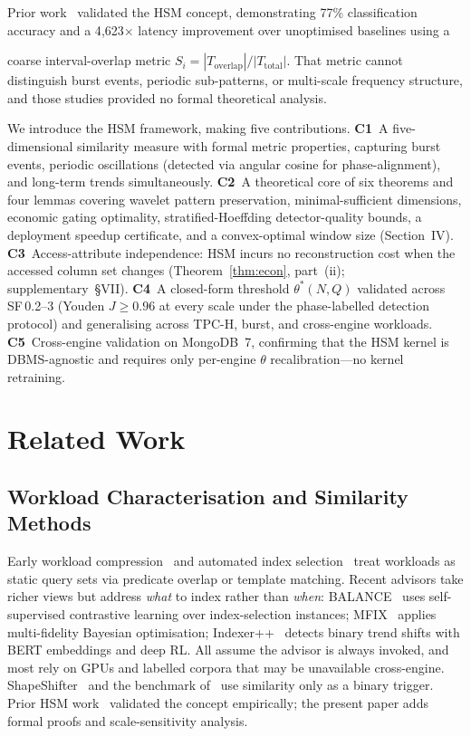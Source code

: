 \documentclass[10pt,journal,compsoc]{IEEEtran}
\newcommand{\thetastar}{\theta^{*}}
\begin{document}
Prior work~\cite{Reungsinkonkarn2026iEEECON,Reungsilpkolkarn2026ICICT}
validated the HSM concept, demonstrating 77\% classification accuracy and
a 4{,}623$\times$ latency improvement over unoptimised baselines using a

coarse interval-overlap metric $S_i=|T_{\mathrm{overlap}}|/|T_{\mathrm{total}}|$.
That metric cannot distinguish burst events, periodic sub-patterns, or
multi-scale frequency structure, and those studies provided no formal
theoretical analysis.

We introduce the HSM framework, making five contributions.
\textbf{C1}~A five-dimensional similarity measure with formal metric
properties, capturing burst events, periodic oscillations (detected
via angular cosine for phase-alignment), and long-term trends
simultaneously.
\textbf{C2}~A theoretical core of six theorems and four lemmas
covering wavelet pattern preservation, minimal-sufficient dimensions,
economic gating optimality, stratified-Hoeffding detector-quality
bounds, a deployment speedup certificate, and a convex-optimal
window size (Section~IV).
\textbf{C3}~Access-attribute independence: HSM incurs no
reconstruction cost when the accessed column set changes
(Theorem~\ref{thm:econ}, part~(ii); supplementary~\S VII).
\textbf{C4}~A closed-form threshold $\thetastar(N,Q)$ validated
across SF\,0.2--3 (Youden $J\!\ge\!0.96$ at every scale under the
phase-labelled detection protocol) and generalising across TPC-H,
burst, and cross-engine workloads.
\textbf{C5}~Cross-engine validation on MongoDB~7, confirming that
the HSM kernel is DBMS-agnostic and requires only per-engine
$\theta$ recalibration---no kernel retraining.

\section{Related Work}

\subsection{Workload Characterisation and Similarity Methods}

Early workload compression~\cite{Schnaitter2006COLT} and automated
index selection~\cite{Chaudhuri1997Index} treat workloads as static
query sets via predicate overlap or template matching.  Recent
advisors take richer views but address \emph{what} to index rather
than \emph{when}: BALANCE~\cite{Wang2024BALANCE} uses self-supervised
contrastive learning over index-selection instances;
MFIX~\cite{Chang2024MFIX} applies multi-fidelity Bayesian
optimisation; Indexer++~\cite{Sharma2022IndexerPP} detects binary
trend shifts with BERT embeddings and deep RL.  All assume the
advisor is always invoked, and most rely on GPUs and labelled
corpora that may be unavailable cross-engine.
ShapeShifter~\cite{Wang2025ShapeShifter} and the benchmark
of~\cite{Brucato2025WorkloadSim} use similarity only as a binary
trigger.  Prior HSM work~\cite{Reungsinkonkarn2026iEEECON,%
Reungsilpkolkarn2026ICICT} validated the concept empirically; the
present paper adds formal proofs and scale-sensitivity analysis.
\end{document}
